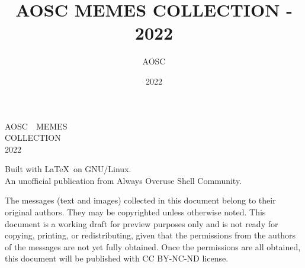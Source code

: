 \documentclass[10pt,a4paper]{report}
\title{AOSC MEMES COLLECTION - 2022}
\author{AOSC}
\date{2022}
\begin{document}
\begin{titlepage}
	\leavevmode
	\vskip 50mm
	\begin{center}
        \rmfamily{}
		\parbox{75mm}{
            \center\rmfamily{}\Huge\baselineskip=40pt
            A\hfill O\hfill S\hfill C~~\hfill M\hfill E\hfill M\hfill E\hfill S\\
            C\hfill O\hfill L\hfill L\hfill E\hfill C\hfill T\hfill I\hfill O\hfill N\\
            2022
        }\par
		\vfill
        \sffamily
		\normalsize
        Built with \LaTeX~on GNU/Linux.\\
        An unofficial publication from Always Overuse Shell Community.
	\end{center}
\end{titlepage}




\begin{multicols*}{2}
	
\end{multicols*}




\clearpage
\leavevmode
\vfill
\small
\sffamily
The messages (text and images) collected in this document belong to their original authors.
They may be copyrighted unless otherwise noted.
This document is a working draft for preview purposes only and is not ready for copying, printing, or redistributing,
given that the permissions from the authors of the messages are not yet fully obtained.
Once the permissions are all obtained, this document will be published with CC BY-NC-ND license.
\end{document}
